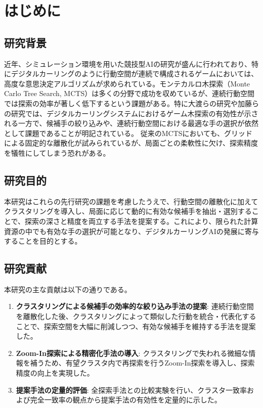 \documentclass[11pt,a4j]{jreport}
\begin{document}

\tableofcontents

\pagestyle{fancy}
\lhead{\leftmark}
\rhead{\rightmark}
\renewcommand{\chaptermark}[1]{\markboth{第\ \normalfont\thechapter\ 章~~#1}{}}
\renewcommand{\sectionmark}[1]{\markright{\normalfont\thesection~~#1}}

\chapter[はじめに]{はじめに}

\section{研究背景}
近年、シミュレーション環境を用いた競技型AIの研究が盛んに行われており、特にデジタルカーリングのように行動空間が連続で構成されるゲームにおいては、高度な意思決定アルゴリズムが求められている。モンテカルロ木探索（Monte Carlo Tree Search, MCTS）は多くの分野で成功を収めているが、連続行動空間では探索の効率が著しく低下するという課題がある。特に大渡らの研究や加藤らの研究では、デジタルカーリングシステムにおけるゲーム木探索の有効性が示される一方で、候補手の絞り込みや、連続行動空間における最適な手の選択が依然として課題であることが明記されている。
従来のMCTSにおいても、グリッドによる固定的な離散化が試みられているが、局面ごとの柔軟性に欠け、探索精度を犠牲にしてしまう恐れがある。

\section{研究目的}
本研究はこれらの先行研究の課題を考慮したうえで、行動空間の離散化に加えてクラスタリングを導入し、局面に応じて動的に有効な候補手を抽出・選別することで、探索の深さと精度を両立する手法を提案する。これにより、限られた計算資源の中でも有効な手の選択が可能となり、デジタルカーリングAIの発展に寄与することを目的とする。

\section{研究貢献}
本研究の主な貢献は以下の通りである。
\begin{enumerate}
    \item \textbf{クラスタリングによる候補手の効率的な絞り込み手法の提案}: 連続行動空間を離散化した後、クラスタリングによって類似した行動を統合・代表化することで、探索空間を大幅に削減しつつ、有効な候補手を維持する手法を提案した。
    \item \textbf{Zoom-In探索による精密化手法の導入}: クラスタリングで失われる微細な情報を補うため、有望クラスタ内で再探索を行うZoom-In探索を導入し、探索精度の向上を実現した。
    \item \textbf{提案手法の定量的評価}: 全探索手法との比較実験を行い、クラスタ一致率および完全一致率の観点から提案手法の有効性を定量的に示した。
\end{enumerate}
\end{document}
